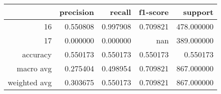\begin{table}[h]
\centering
\label{table:5}
\begin{tabular}{rrrrr}
\toprule
 & precision & recall & f1-score & support \\
\midrule
16 & 0.550808 & 0.997908 & 0.709821 & 478.000000 \\
17 & 0.000000 & 0.000000 & nan & 389.000000 \\
accuracy & 0.550173 & 0.550173 & 0.550173 & 0.550173 \\
macro avg & 0.275404 & 0.498954 & 0.709821 & 867.000000 \\
weighted avg & 0.303675 & 0.550173 & 0.709821 & 867.000000 \\
\bottomrule
\end{tabular}
\end{table}
